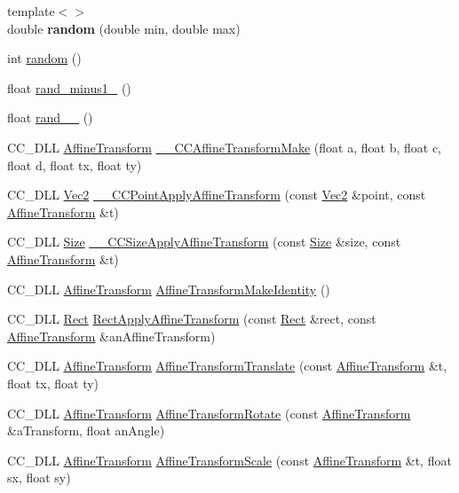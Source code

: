 \begin{DoxyCompactItemize}
{\footnotesize template$<$$>$ }\\double {\bfseries random} (double min, double max)
\item 
int \hyperlink{group__base_ga84e4437f43bda4dd8f4cabda651f8eb7}{random} ()
\item 
float \hyperlink{group__base_ga797b895e22eea2306c62d82f3cf39fa0}{rand\+\_\+minus1\+\_} ()
\item 
float \hyperlink{group__base_ga625692e695f126833dfcb4f12ee62a89}{rand\+\_\+\_} ()
\item 
C\+C\+\_\+\+D\+LL \hyperlink{structAffineTransform}{Affine\+Transform} \hyperlink{group__base_ga6512cedee05a78771b7aac4e4d57a499}{\+\_\+\+\_\+\+C\+C\+Affine\+Transform\+Make} (float a, float b, float c, float d, float tx, float ty)
\item 
C\+C\+\_\+\+D\+LL \hyperlink{classVec2}{Vec2} \hyperlink{group__base_ga925cec1fb977da8fb3d8280ba82cc5c7}{\+\_\+\+\_\+\+C\+C\+Point\+Apply\+Affine\+Transform} (const \hyperlink{classVec2}{Vec2} \&point, const \hyperlink{structAffineTransform}{Affine\+Transform} \&t)
\item 
C\+C\+\_\+\+D\+LL \hyperlink{classSize}{Size} \hyperlink{group__base_ga40f990327de656e394d23b0650208008}{\+\_\+\+\_\+\+C\+C\+Size\+Apply\+Affine\+Transform} (const \hyperlink{classSize}{Size} \&size, const \hyperlink{structAffineTransform}{Affine\+Transform} \&t)
\item 
C\+C\+\_\+\+D\+LL \hyperlink{structAffineTransform}{Affine\+Transform} \hyperlink{group__base_ga7b484613387f6495c8efc75123f9c347}{Affine\+Transform\+Make\+Identity} ()
\item 
C\+C\+\_\+\+D\+LL \hyperlink{classRect}{Rect} \hyperlink{group__base_gad5ce61c33cc9b7cdce94ce8d8d5a38a6}{Rect\+Apply\+Affine\+Transform} (const \hyperlink{classRect}{Rect} \&rect, const \hyperlink{structAffineTransform}{Affine\+Transform} \&an\+Affine\+Transform)
\item 
C\+C\+\_\+\+D\+LL \hyperlink{structAffineTransform}{Affine\+Transform} \hyperlink{group__base_gaefdb84585eca14848606e09f00088cc9}{Affine\+Transform\+Translate} (const \hyperlink{structAffineTransform}{Affine\+Transform} \&t, float tx, float ty)
\item 
C\+C\+\_\+\+D\+LL \hyperlink{structAffineTransform}{Affine\+Transform} \hyperlink{group__base_gaa8df41d4f248108273bcea0a0aab588a}{Affine\+Transform\+Rotate} (const \hyperlink{structAffineTransform}{Affine\+Transform} \&a\+Transform, float an\+Angle)
\item 
C\+C\+\_\+\+D\+LL \hyperlink{structAffineTransform}{Affine\+Transform} \hyperlink{group__base_gacf87a20201f4b20eac393af2f897ead0}{Affine\+Transform\+Scale} (const \hyperlink{structAffineTransform}{Affine\+Transform} \&t, float sx, float sy)

\end{DoxyCompactItemize}
